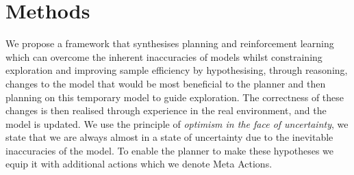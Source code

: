 \chapter{Methods}
\label{chapter4}
We propose a framework that synthesises planning and reinforcement learning which can overcome the inherent inaccuracies of models whilst constraining exploration  and improving sample efficiency by hypothesising, through reasoning, changes to the model that would be most beneficial to the planner and then planning on this temporary model to guide exploration. The correctness of these changes is then realised through experience in the real environment, and the model is updated.
We use the principle of \textit{optimism in the face of uncertainty}, we state that we are always almost in a state of uncertainty due to the inevitable inaccuracies of the model.
To enable the planner to make these hypotheses we equip it with additional actions which we denote Meta Actions.
